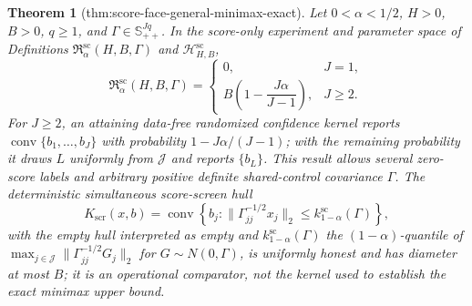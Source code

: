 \documentclass{article}
\newtheorem{theorem}{Theorem}
\begin{document}
\begin{theorem}[thm:score-face-general-minimax-exact]\label{thm:score-face-general-minimax-exact}
Let \(0<\alpha<1/2\), \(H>0\), \(B>0\), \(q\geq1\), and \(\Gamma\in\mathbb S_{++}^{Jq}\). In the score-only experiment and parameter space of Definitions \(\mathfrak R_{\alpha}^{\mathrm{sc}}(H,B,\Gamma)\) and \(\mathcal H_{H,B}^{\mathrm{sc}}\),
\[
 \mathfrak R_{\alpha}^{\mathrm{sc}}(H,B,\Gamma)
 =
 \begin{cases}
 0, & J=1,\\[2mm]
 B\left(1-\dfrac{J\alpha}{J-1}\right), & J\geq2.
 \end{cases}
\]
For \(J\geq2\), an attaining data-free randomized confidence kernel reports \(\operatorname{conv}\{b_1,\ldots,b_J\}\) with probability \(1-J\alpha/(J-1)\); with the remaining probability it draws \(L\) uniformly from \(\mathcal J\) and reports \(\{b_L\}\). This result allows several zero-score labels and arbitrary positive definite shared-control covariance \(\Gamma\). The deterministic simultaneous score-screen hull
\[
 K_{\mathrm{scr}}(x,b)
 =\operatorname{conv}\left\{b_j:
 \lVert\Gamma_{jj}^{-1/2}x_j\rVert_2
 \leq k_{1-\alpha}^{\mathrm{sc}}(\Gamma)
 \right\},
\]
with the empty hull interpreted as empty and \(k_{1-\alpha}^{\mathrm{sc}}(\Gamma)\) the \((1-\alpha)\)-quantile of \(\max_{j\in\mathcal J}\lVert\Gamma_{jj}^{-1/2}G_j\rVert_2\) for \(G\sim N(0,\Gamma)\), is uniformly honest and has diameter at most \(B\); it is an operational comparator, not the kernel used to establish the exact minimax upper bound.
\end{theorem}
\end{document}
